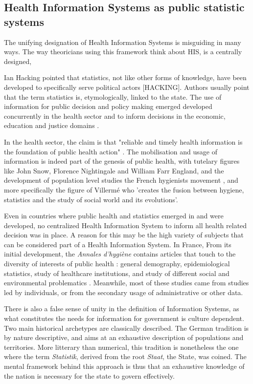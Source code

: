 \documentclass[letterpaper, 10 pt, conference]{IEEEconf}  %
\begin{document}
\subsection{Health Information Systems as public statistic systems}

The unifying designation of Health Information Systems is misguiding in many ways. The way theoricians using this framework think about HIS, is a centrally designed, 

Ian Hacking pointed that statistics, not like other forms of knowledge, have been developed to specifically serve political actors [HACKING]. Authors usually point that the term statistics is, etymologically, linked to the state. The use of information for public decision and policy making emerged developed concurrently in the health sector and to inform decisions in the economic, education and justice domains \cite{desrosieres_politique_1993, lecuyer_medecins_1977, porter_trust_1996}.

In the health sector, the claim is that "reliable and timely health information is the foundation of public health action" \cite{abou-zahr_health_2005, health_metrics_network_framework_2008}. The mobilisation and usage of information is indeed part of the genesis of public health, with tutelary figures like John Snow, Florence Nightingale and William Farr England, and the development of population level studies the French hygienists movement	\cite{porter_trust_1996}, and more specifically the figure of Villermé who 'creates the fusion between hygiene, statistics and the study of social world and its evolutions'.

Even in countries where public health and statistics emerged in and were developed, no centralized Health Information System to inform all health related decision was in place. A reason for this may be the high variety of subjects that can be considered part of a Health Information System. In France, From its initial development, the \textit{Annales d'hygiène} contains articles that touch to the diversity of interests of public health : general demography, epidemiological statistics, study of healthcare institutions, and study of different social and environmental problematics \cite{lecuyer_medecins_1977}. Meanwhile, most of these studies came from studies led by individuals, or from the secondary usage of administrative or other data.

There is also a false sense of unity in the definition of Information Systems, as what constitutes the needs for information for government is culture dependent. Two main historical archetypes are classically described. The German tradition is by nature descriptive, and aims at an exhaustive description of  populations and territories. More litterary than numerical, this tradition is nonetheless the one where the term \textit{Statistik}, derived from the root \textit{Staat}, the State, was coined. The mental framework behind this approach is thus that an exhaustive knowledge of the nation is necessary for the state to govern effectively.
\end{document}
